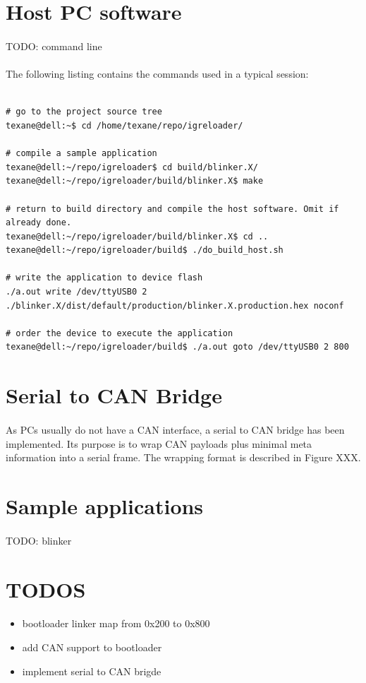 \documentclass[a4paper, 11pt]{article}
\begin{document}
\newpage
\section{Host PC software}
\paragraph{}
TODO: command line

\paragraph{}
The following listing contains the commands used in a typical session:
\begin{tiny}
\begin{lstlisting}[frame=tb]

# go to the project source tree
texane@dell:~$ cd /home/texane/repo/igreloader/

# compile a sample application
texane@dell:~/repo/igreloader$ cd build/blinker.X/
texane@dell:~/repo/igreloader/build/blinker.X$ make

# return to build directory and compile the host software. Omit if already done.
texane@dell:~/repo/igreloader/build/blinker.X$ cd ..
texane@dell:~/repo/igreloader/build$ ./do_build_host.sh

# write the application to device flash
./a.out write /dev/ttyUSB0 2 ./blinker.X/dist/default/production/blinker.X.production.hex noconf

# order the device to execute the application
texane@dell:~/repo/igreloader/build$ ./a.out goto /dev/ttyUSB0 2 800
\end{lstlisting}
\end{tiny}


\newpage
\section{Serial to CAN Bridge}
\paragraph{}
As PCs usually do not have a CAN interface, a serial to CAN bridge has been implemented. Its purpose is to
wrap CAN payloads plus minimal meta information into a serial frame. The wrapping format is described in
Figure XXX.


\newpage
\section{Sample applications}
\paragraph{}
TODO: blinker


\newpage
\section{TODOS}
\paragraph{}
\begin{itemize}
\item bootloader linker map from 0x200 to 0x800
\item add CAN support to bootloader
\item implement serial to CAN brigde
\end{itemize}
\end{document}
